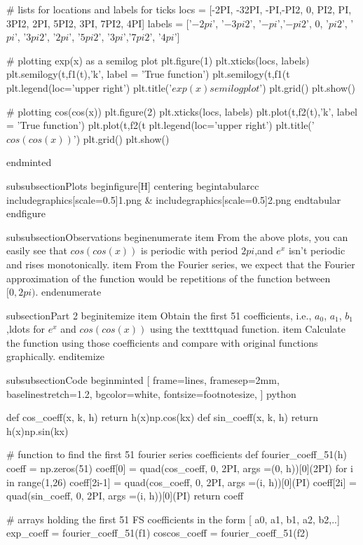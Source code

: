 # lists for locations and labels for ticks
locs = [-2PI, -32PI, -PI,-PI2, 0, PI2, PI, 3PI2, 2PI, 5PI2, 3PI, 7PI2, 4PI]
labels = ['$-2pi$', '$-3pi2$', '$-pi$','$-pi2$', 0, '$pi2$', '$pi$', '$3pi2$', '$2pi$', '$5pi2$', '$3pi$','$7pi2$', '$4pi$']

# plotting exp(x) as a semilog plot
plt.figure(1)
plt.xticks(locs, labels) 
plt.semilogy(t,f1(t),'k', label = 'True function')
plt.semilogy(t,f1(t%
plt.legend(loc='upper right')
plt.title('$exp(x) semilog plot$')
plt.grid()
plt.show()

# plotting cos(cos(x))
plt.figure(2)
plt.xticks(locs, labels) 
plt.plot(t,f2(t),'k', label = 'True function')
plt.plot(t,f2(t%
plt.legend(loc='upper right')
plt.title('$cos(cos(x))$')
plt.grid()
plt.show()

end{minted}

subsubsection{Plots}
begin{figure}[H]
    centering
    begin{tabular}{cc}
        includegraphics[scale=0.5]{1.png} &                includegraphics[scale=0.5]{2.png}
    end{tabular}
end{figure}

subsubsection{Observations}
begin{enumerate}
    item From the above plots, you can easily see that $cos(cos(x))$ is periodic with period $2pi$,and $e^x$ isn't periodic and rises monotonically.
    item From the Fourier series, we expect that the Fourier approximation of the function would be repetitions of the function between $[0, 2pi)$. 
end{enumerate}

subsection{Part 2}
begin{itemize}
    item Obtain the first 51 coefficients, i.e., $a_0$, $a_1$, $b_1$,ldots for $e^x$ and $cos(cos(x))$ using the texttt{quad} function.
    item Calculate the function using those coefficients and compare with original functions graphically.
end{itemize}
 
subsubsection{Code}
begin{minted}
[
frame=lines,
framesep=2mm,
baselinestretch=1.2,
bgcolor=white,
fontsize=footnotesize,
]
{python}

def cos_coeff(x, k, h)
    return h(x)np.cos(kx)
def sin_coeff(x, k, h)
    return h(x)np.sin(kx)

# function to find the first 51 fourier series coefficients
def fourier_coeff_51(h)
    coeff = np.zeros(51)
    coeff[0] = quad(cos_coeff, 0, 2PI, args =(0, h))[0](2PI)
    for i in range(1,26)
        coeff[2i-1] = quad(cos_coeff, 0, 2PI, args =(i, h))[0](PI)
        coeff[2i] = quad(sin_coeff, 0, 2PI, args =(i, h))[0](PI)
    return  coeff

# arrays holding the first 51 FS coefficients in the form [ a0, a1, b1, a2, b2,..]
exp_coeff = fourier_coeff_51(f1)
coscos_coeff = fourier_coeff_51(f2)

